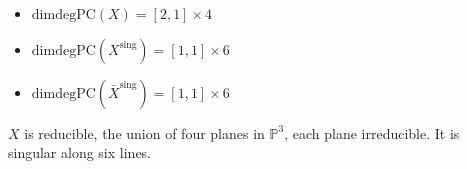 \documentclass{amsart}
\begin{document}


\begin{example}[Algebra M]\leavevmode
\begin{itemize}
   \item \(\mathrm{dimdegPC}(X) = [2,1]\times4\)
   \item \(\mathrm{dimdegPC}(X^{\mathrm{sing}}) = [1,1]\times6\)
   \item \(\mathrm{dimdegPC}(\bar{X}^{\mathrm{sing}}) = [1,1]\times6\)
\end{itemize}

\(X\) is reducible, the union of four planes in \(\mathbb{P}^3\), each plane irreducible. It is singular along six lines.
\end{example}




 


\end{document}
